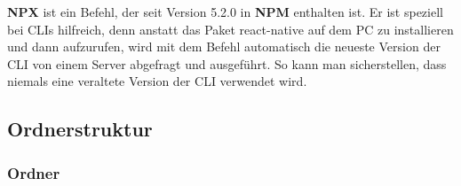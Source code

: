 \textbf{NPX} ist ein Befehl, der seit Version 5.2.0 in \textbf{NPM} enthalten ist. Er ist speziell bei CLIs hilfreich,
denn anstatt das Paket react-native auf dem PC zu installieren und dann aufzurufen, wird mit dem
Befehl automatisch die neueste Version der CLI von einem Server abgefragt und ausgeführt. So kann
man sicherstellen, dass niemals eine veraltete Version der CLI verwendet wird.

\newpage

\subsection{Ordnerstruktur}

\subsubsection{Ordner}


